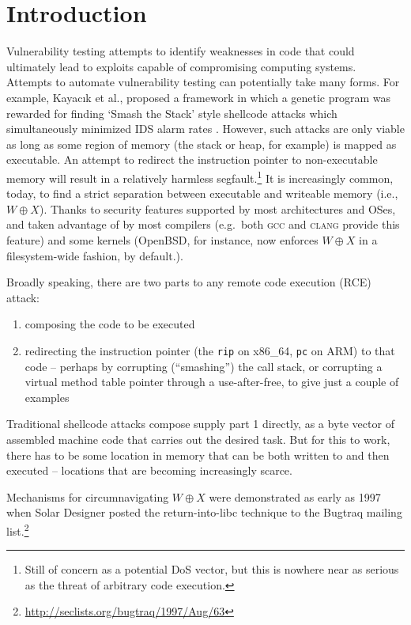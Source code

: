 %
\section{Introduction}

Vulnerability testing attempts to identify weaknesses in code
that could ultimately lead to exploits capable of compromising
computing systems. Attempts to automate vulnerability testing can
potentially take many forms. For example, Kayac\i{}k et al.,
proposed a framework in which a genetic program was rewarded for
finding `Smash the Stack' style shellcode attacks which
simultaneously minimized IDS alarm rates
\cite{kayacik06,kayacik11}. However, such attacks are only viable
as long as some region of memory (the stack or heap, for example)
is mapped as
executable. An attempt to redirect the instruction pointer to
non-executable memory will result in a relatively harmless
segfault.\footnote{Still of concern as a potential DoS vector,
but this is nowhere near as serious as the threat of arbitrary
code execution.} It is increasingly common, today, to find
a strict separation between executable and writeable memory (i.e., $W\oplus X$).
Thanks to security features
supported by most architectures and OSes, and taken advantage of by
most compilers (e.g.\ both \textsc{gcc} and \textsc{clang} provide
this feature) and some kernels (OpenBSD, for instance, now enforces $W\oplus X$ in a filesystem-wide fashion, by default.).

Broadly speaking, there are two parts to any remote code execution (RCE) attack:
\begin{enumerate}
\item composing the code to be executed
\item redirecting the instruction pointer (the \texttt{rip} on x86\_64, \texttt{pc} on ARM) to that code -- perhaps by corrupting (``smashing'') the call stack, or corrupting a virtual method table pointer through a use-after-free, to give just a couple of examples 
\end{enumerate}

Traditional shellcode attacks compose supply part 1 directly, as a byte vector of assembled machine code that carries out the desired task. But for this to work, there has to be some location in memory that can be both written to and then executed -- locations that are becoming increasingly scarce.

Mechanisms for circumnavigating $W\oplus X$
were demonstrated as early as 1997 when Solar Designer
posted the return-into-libc technique to the Bugtraq mailing
list.\footnote{\url{http://seclists.org/bugtraq/1997/Aug/63}}

